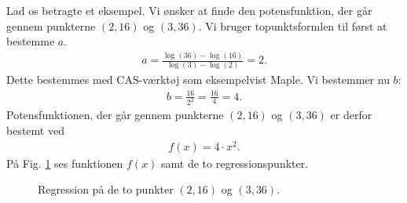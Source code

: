 \begin{exa}
Lad os betragte et eksempel. Vi ønsker at finde den potensfunktion, der går gennem punkterne $(2,16)$ og  $(3,36)$. 
Vi bruger topunktsformlen til først at bestemme $a$.
\begin{align*}
a = \frac{\log(36)-\log(16)}{\log(3)-\log(2)} = 2.
\end{align*}
Dette bestemmes med CAS-værktøj som eksempelvist Maple. 
Vi bestemmer nu $b$:
\begin{align*}
b = \frac{16}{2^2} = \frac{16}{4} = 4.
\end{align*}
Potensfunktionen, der går gennem punkterne  $(2,16)$ og  $(3,36)$ er derfor bestemt ved
\begin{align*}
f(x) = 4\cdot x^2.
\end{align*}
På Fig. \ref{fig:topunktpotens} ses funktionen $f(x)$ samt de to regressionspunkter. 
\begin{figure}[H]
\centering
{}
\caption{Regression på de to punkter $(2,16)$ og $(3,36)$.}
\label{fig:topunktpotens}
\end{figure}
\end{exa}

